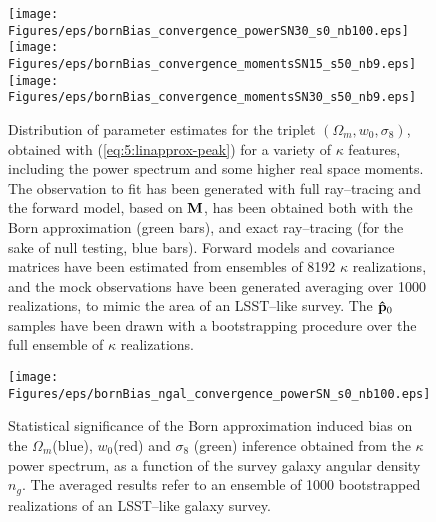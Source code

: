 % 
\begin{figure}
\begin{center}
\texttt{[image: Figures/eps/bornBias\_convergence\_powerSN30\_s0\_nb100.eps]}
\texttt{[image: Figures/eps/bornBias\_convergence\_momentsSN15\_s50\_nb9.eps]}
\texttt{[image: Figures/eps/bornBias\_convergence\_momentsSN30\_s50\_nb9.eps]}
\end{center}
\caption{Distribution of parameter estimates for the triplet $(\Omega_m,w_0,\sigma_8)$, obtained with (\ref{eq:5:linapprox-peak}) for a variety of $\kappa$ features, including the power spectrum and some higher real space moments. The observation to fit has been generated with full ray--tracing and the forward model, based on $\mathbf{M}$, has been obtained both with the Born approximation (green bars), and exact ray--tracing (for the sake of null testing, blue bars). Forward models and covariance matrices have been estimated from ensembles of 8192 $\kappa$ realizations, and the mock observations have been generated averaging over 1000 realizations, to mimic the area of an LSST--like survey. The $\mathbf{\hat{p}}_0$ samples have been drawn with a bootstrapping procedure over the full ensemble of $\kappa$ realizations.}
\label{fig:7:biasfeat}
\end{figure}
%
\begin{figure}
\begin{center}
\texttt{[image: Figures/eps/bornBias\_ngal\_convergence\_powerSN\_s0\_nb100.eps]}
\end{center}
\caption{Statistical significance of the Born approximation induced bias on the $\Omega_m$(blue), $w_0$(red) and  $\sigma_8$ (green) inference obtained from the $\kappa$ power spectrum, as a function of the survey galaxy angular density $n_g$. The averaged results refer to an ensemble of 1000 bootstrapped realizations of an LSST--like galaxy survey.}
\label{fig:7:biasbornngal}
\end{figure}
%
